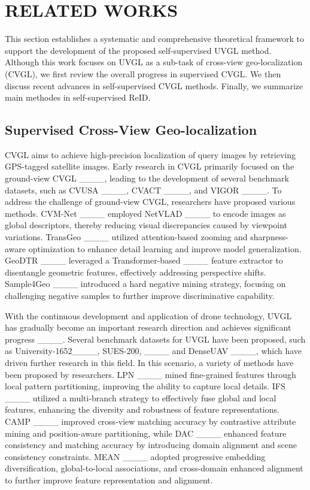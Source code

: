 \section{RELATED WORKS}
\label{related works}
This section establishes a systematic and comprehensive theoretical framework to support the development of the proposed self-supervised UVGL method. Although this work focuses on UVGL as a sub-task of cross-view geo-localization (CVGL), we first review the overall progress in supervised CVGL. We then discuss recent advances in self-supervised CVGL methods. Finally, we summarize main methodes in self-supervised ReID.
\subsection{Supervised Cross-View Geo-localization}
CVGL aims to achieve high-precision localization of query images by retrieving GPS-tagged satellite images. Early research in CVGL primarily focused on the ground-view CVGL ____, leading to the development of several benchmark datasets, such as CVUSA ____, CVACT ____, and VIGOR ____. To address the challenge of ground-view CVGL, researchers have proposed various methods. CVM-Net 
____ employed NetVLAD ____ to encode images as global descriptors, thereby reducing visual discrepancies caused by viewpoint variations. TransGeo ____ utilized attention-based zooming and sharpness-aware optimization to enhance detail learning and improve model generalization. GeoDTR ____ leveraged a Transformer-based ____ feature extractor to disentangle geometric features, effectively addressing perspective shifts. Sample4Geo ____ introduced a hard negative mining strategy, focusing on challenging negative samples to further improve discriminative capability.

With the continuous development and application of drone technology, UVGL has gradually become an important research direction and achieves significant progress ____. Several benchmark datasets for UVGL have been proposed, such as University-1652____, SUES-200, ____ and DenseUAV ____, which have driven further research in this field. In this scenario, a variety of methods have been proposed by researchers. LPN ____ mined fine-grained features through local pattern partitioning, improving the ability to capture local details. IFS ____ utilized a multi-branch strategy to effectively fuse global and local features, enhancing the diversity and robustness of feature representations. CAMP ____ improved cross-view matching accuracy by contrastive attribute mining and position-aware partitioning, while DAC ____ enhanced feature consistency and matching accuracy by introducing domain alignment and scene consistency constraints. MEAN ____ adopted progressive embedding diversification, global-to-local associations, and cross-domain enhanced alignment to further improve feature representation and alignment.

